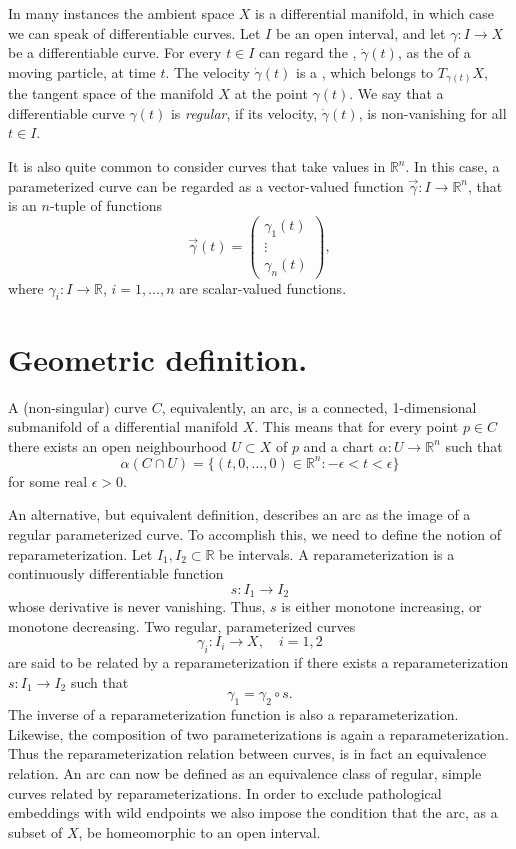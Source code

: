 \documentclass[12pt]{article}
\newcommand{\Rset}{\mathbb{R}}
\begin{document}
In many instances the ambient space $X$ is a differential manifold, in
which case we can speak of differentiable curves. Let $I$ be an open
interval, and let $\gamma:I\to X$ be a differentiable curve. For
every $t\in I$ can regard the ,
$\dot{\gamma}(t)$, as the  of a
moving particle, at time $t$. The velocity $\dot{\gamma}(t)$ is a
, which belongs to
$T_{\gamma(t)} X$, the tangent space of the manifold $X$ at the point
$\gamma(t)$. We say that a differentiable curve $\gamma(t)$ is
\emph{regular}, if its velocity, $\dot{\gamma}(t)$, is non-vanishing
for all $t\in I$.

It is also quite common to consider curves that take values in
$\Rset^n$. In this case, a parameterized curve can be regarded as a
vector-valued function $\vec{\gamma}:I \to \Rset^n$, that is an
  $n$-tuple of functions $$\vec{\gamma}(t) =
\begin{pmatrix}
\gamma_1(t)\\ \vdots \\ \gamma_n(t)
\end{pmatrix},$$
where $\gamma_i:I\to \Rset$, $i=1,\ldots,n$ are scalar-valued functions.

\section*{Geometric definition.}
A (non-singular) curve $C$, equivalently, an arc, is a connected,
1-dimensional submanifold of a differential manifold $X$. This means
that for every point $p\in C$ there exists an open neighbourhood
$U\subset X$ of $p$ and a chart $\alpha:U\to \Rset^n$ such that
$$\alpha(C\cap U) = \{ (t,0,\ldots,0)\in \Rset^n :
-\epsilon<t<\epsilon\}$$
for some real $\epsilon>0$.

An alternative, but equivalent definition, describes an arc as the
image of a regular parameterized curve. To accomplish this, we need
to define the notion of reparameterization. Let $I_1,I_2\subset
\Rset$ be intervals. A reparameterization is a continuously
differentiable function
$$s:I_1\to I_2$$ whose derivative is never vanishing. Thus, $s$ is
either monotone increasing, or monotone decreasing.
Two regular, parameterized curves
$$\gamma_i:I_i\to X,\quad i=1,2$$
are said to be related by a reparameterization if there exists a
reparameterization $s:I_1\to I_2$ such that
$$\gamma_1 = \gamma_2\circ s.$$
The inverse of a reparameterization
function is also a reparameterization. Likewise, the composition of
two parameterizations is again a reparameterization. Thus the
reparameterization relation between curves, is in fact an
equivalence relation. An arc can now be defined as an equivalence
class of regular, simple curves related by reparameterizations. In
order to exclude pathological embeddings with wild endpoints we also
impose the condition that the arc, as a subset of $X$, be
homeomorphic to an open interval.
\end{document}
